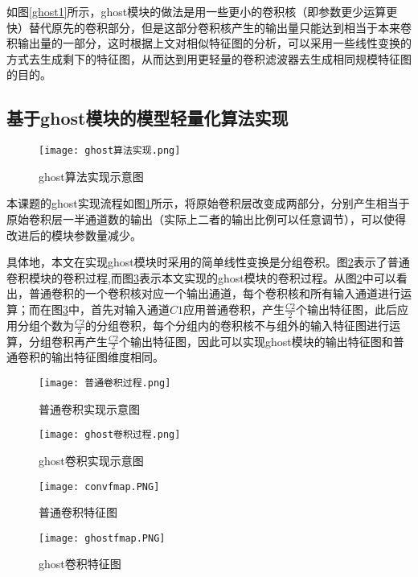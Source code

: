 如图\ref{ghost1}所示，ghost模块的做法是用一些更小的卷积核（即参数更少运算更快）替代原先的卷积部分，但是这部分卷积核产生的输出量只能达到相当于本来卷积输出量的一部分，这时根据上文对相似特征图的分析，可以采用一些线性变换的方式去生成剩下的特征图，从而达到用更轻量的卷积滤波器去生成相同规模特征图的目的。

\subsection{基于ghost模块的模型轻量化算法实现}

\begin{figure}[htbp]
    \centering
    \texttt{[image: ghost算法实现.png]}
    \caption{ghost算法实现示意图}
    \label{ghost2}
\end{figure}

本课题的ghost实现流程如图\ref{ghost2}所示，将原始卷积层改变成两部分，分别产生相当于原始卷积层一半通道数的输出（实际上二者的输出比例可以任意调节），可以使得改进后的模块参数量减少。

具体地，本文在实现ghost模块时采用的简单线性变换是分组卷积。图\ref{convp}表示了普通卷积模块的卷积过程,而图\ref{ghostp}表示本文实现的ghost模块的卷积过程。从图\ref{convp}中可以看出，普通卷积的一个卷积核对应一个输出通道，每个卷积核和所有输入通道进行运算；而在图\ref{ghostp}中，首先对输入通道$C1$应用普通卷积，产生$\frac{C2}{2}$个输出特征图，此后应用分组个数为$\frac{C2}{2}$的分组卷积，每个分组内的卷积核不与组外的输入特征图进行运算，分组卷积再产生$\frac{C2}{2}$个输出特征图，因此可以实现ghost模块的输出特征图和普通卷积的输出特征图维度相同。
\begin{figure}[htbp]
    \centering
    \texttt{[image: 普通卷积过程.png]}
    \caption{普通卷积实现示意图}
    \label{convp}
\end{figure}

\begin{figure}[htbp]
    \centering
    \texttt{[image: ghost卷积过程.png]}
    \caption{ghost卷积实现示意图}
    \label{ghostp}
\end{figure}

\begin{figure}[htbp]
	\centering
	\begin{minipage}{0.49\linewidth}
		\centering
		\texttt{[image: convfmap.PNG]}
		\caption{普通卷积特征图}
		\label{convf}%
	\end{minipage}
	\begin{minipage}{0.49\linewidth}
		\centering
		\texttt{[image: ghostfmap.PNG]}
		\caption{ghost卷积特征图}
		\label{ghostf}%
	\end{minipage}
\end{figure}

